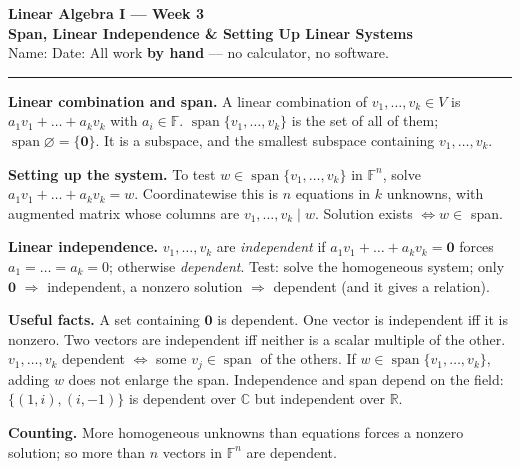 \documentclass[11pt]{article}
\begin{document}
{\Large\bfseries\color{ink} Linear Algebra I --- Week 3}\\[2pt]
{\large\bfseries\color{ink} Span, Linear Independence \& Setting Up Linear Systems}\\[3pt]
{\small Name: \underline{\hspace{5cm}}\hfill Date: \underline{\hspace{3cm}}\qquad All work \textbf{by hand} --- no calculator, no software.}
\vspace{4pt}\hrule\vspace{8pt}

\begin{tcolorbox}[colback=soft,colframe=ink,title={\bfseries Key Facts}]
\textbf{Linear combination and span.} A linear combination of $v_1,\dots,v_k\in V$ is $a_1v_1+\dots+a_kv_k$ with $a_i\in\mathbb{F}$. $\operatorname{span}\{v_1,\dots,v_k\}$ is the set of all of them; $\operatorname{span}\varnothing=\{\mathbf 0\}$. It is a subspace, and the smallest subspace containing $v_1,\dots,v_k$.

\textbf{Setting up the system.} To test $w\in\operatorname{span}\{v_1,\dots,v_k\}$ in $\mathbb{F}^{n}$, solve $a_1v_1+\dots+a_kv_k=w$. Coordinatewise this is $n$ equations in $k$ unknowns, with augmented matrix whose columns are $v_1,\dots,v_k\mid w$. Solution exists $\iff w\in$ span.

\textbf{Linear independence.} $v_1,\dots,v_k$ are \emph{independent} if $a_1v_1+\dots+a_kv_k=\mathbf 0$ forces $a_1=\dots=a_k=0$; otherwise \emph{dependent}. Test: solve the homogeneous system; only $\mathbf 0$ $\Rightarrow$ independent, a nonzero solution $\Rightarrow$ dependent (and it gives a relation).

\textbf{Useful facts.} A set containing $\mathbf 0$ is dependent. One vector is independent iff it is nonzero. Two vectors are independent iff neither is a scalar multiple of the other. $v_1,\dots,v_k$ dependent $\iff$ some $v_j\in\operatorname{span}$ of the others. If $w\in\operatorname{span}\{v_1,\dots,v_k\}$, adding $w$ does not enlarge the span. Independence and span depend on the field: $\{(1,i),(i,-1)\}$ is dependent over $\mathbb{C}$ but independent over $\mathbb{R}$.

\textbf{Counting.} More homogeneous unknowns than equations forces a nonzero solution; so more than $n$ vectors in $\mathbb{F}^{n}$ are dependent.
\end{tcolorbox}

\newpage
\end{document}

